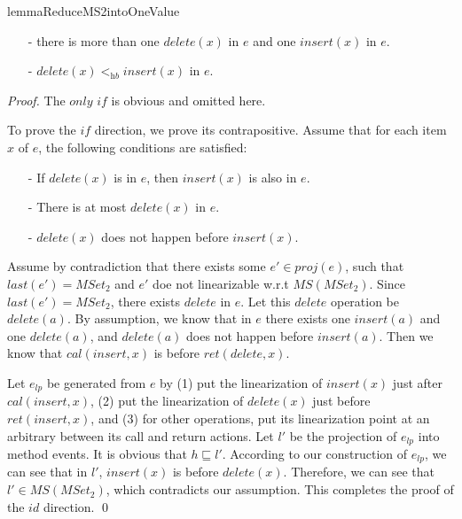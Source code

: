 {\begin{restatable}{lemma}{ReduceMS2intoOneValue}
\begin{itemize}
\item[-] there is more than one $\textit{delete}(x)$ in $e$ and one $\textit{insert}(x)$ in $e$.

\item[-] $\textit{delete}(x) <_{\textit{hb}} \textit{insert}(x)$ in $e$.
\end{itemize}
\end{restatable}

\begin {proof}

The $\textit{only if}$ is obvious and omitted here.

To prove the $\textit{if}$ direction, we prove its contrapositive. Assume that for each item $x$ of $e$, the following conditions are satisfied:

\begin{itemize}
\setlength{\itemsep}{0.5pt}
\item[-] If $\textit{delete}(x)$ is in $e$, then $\textit{insert}(x)$ is also in $e$.

\item[-] There is at most $\textit{delete}(x)$ in $e$.

\item[-] $\textit{delete}(x)$ does not happen before $\textit{insert}(x)$.
\end{itemize}

Assume by contradiction that there exists some $e' \in \textit{proj}(e)$, such that $\textit{last}(e') = \textit{MSet}_2$ and $e'$ doe not linearizable w.r.t $\textit{MS}(\textit{MSet}_2)$. Since $\textit{last}(e') = \textit{MSet}_2$, there exists $\textit{delete}$ in $e$. Let this $\textit{delete}$ operation be $\textit{delete}(a)$. By assumption, we know that in $e$ there exists one $\textit{insert}(a)$ and one $\textit{delete}(a)$, and $\textit{delete}(a)$ does not happen before $\textit{insert}(a)$. Then we know that $\textit{cal}(\textit{insert},x)$ is before $\textit{ret}(\textit{delete},x)$.

Let $e_{\textit{lp}}$ be generated from $e$ by (1) put the linearization of $\textit{insert}(x)$ just after $\textit{cal}(\textit{insert},x)$, (2) put the linearization of $\textit{delete}(x)$ just before $\textit{ret}(\textit{insert},x)$, and (3) for other operations, put its linearization point at an arbitrary between its call and return actions. Let $l'$ be the projection of $e_{\textit{lp}}$ into method events. It is obvious that $h \sqsubseteq l'$. According to our construction of $e_{\textit{lp}}$, we can see that in $l'$, $\textit{insert}(x)$ is before $\textit{delete}(x)$. Therefore, we can see that $l' \in \textit{MS}(\textit{MSet}_2)$, which contradicts our assumption. This completes the proof of the $\textit{id}$ direction. \qed
\end {proof}

}
